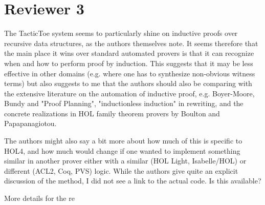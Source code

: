 \documentclass[]{scrartcl}
\begin{document}
\section*{Reviewer 3}

\begin{leftbar}
The TacticToe system seems to particularly shine on inductive proofs over
recursive data structures, as the authors themselves note. It seems
therefore that the main place it wins over standard automated provers is
that it can recognize when and how to perform proof by induction. This
suggests that it may be less effective in other domains (e.g. where one has
to synthesize non-obvious witness terms) but also suggests to me that the
authors should also be comparing with the extensive literature on the
automation of inductive proof, e.g. Boyer-Moore, Bundy and "Proof
Planning", "inductionless induction" in rewriting, and the concrete
realizations in HOL family theorem provers by Boulton and Papapanagiotou.

The authors might also say a bit more about how much of this is specific to
HOL4, and how much would change if one wanted to implement something
similar in another prover either with a similar (HOL Light, Isabelle/HOL)
or different (ACL2, Coq, PVS) logic. While the authors give quite an
explicit discussion of the method, I did not see a link to the actual code.
Is this available?
\end{leftbar}

More details for the re
\end{document}
